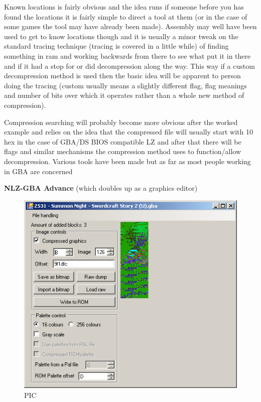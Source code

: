 \documentclass[
]{book}
\begin{document}
Known locations is fairly obvious and the idea runs if someone before you has found the locations it is fairly simple to direct a tool at them (or in the case of some games the tool may have already been made). Assembly may well have been used to get to know locations though and it is usually a minor tweak on the standard tracing technique (tracing is covered in a little while) of finding something in ram and working backwards from there to see what put it in there and if it had a stop for or did decompression along the way. This way if a custom decompression method is used then the basic idea will be apparent to person doing the tracing (custom usually means a slightly different flag, flag meanings and number of bits over which it operates rather than a whole new method of compression).

Compression searching will probably become more obvious after the worked example and relies on the idea that the compressed file will usually start with 10 hex in the case of GBA/DS BIOS compatible LZ and after that there will be flags and similar mechanisms the compression method uses to function/allow decompression. Various tools have been made but as far as most people working in GBA are concerned

\textbf{NLZ-GBA Advance} (which doubles up as a graphics editor)

\begin{figure}
\centering
\includegraphics{images/186_home_fast6191_romhackingguide_unrenamed_fil___ngguidecompressionsearching_NLZGBAadvance_1.png}
\caption{PIC}
\end{figure}
\end{document}
